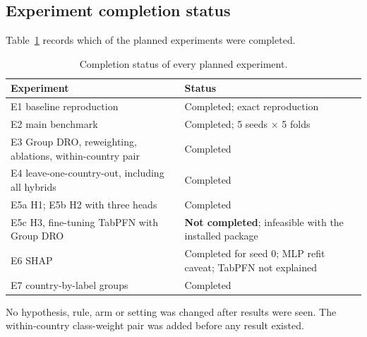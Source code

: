 \documentclass[11pt]{article}
\begin{document}
\subsection{Experiment completion status}

Table~\ref{tab:status} records which of the planned experiments were completed.

\begin{table}[H]
  \centering
  \small
  \caption{Completion status of every planned experiment.}
  \label{tab:status}
  \begin{tabular}{p{}p{}}
    \toprule
    Experiment & Status \\
    \midrule
    E1 baseline reproduction & Completed; exact reproduction \\
    E2 main benchmark & Completed; 5 seeds $\times$ 5 folds \\
    E3 Group DRO, reweighting, ablations, within-country pair & Completed \\
    E4 leave-one-country-out, including all hybrids & Completed \\
    E5a H1; E5b H2 with three heads & Completed \\
    E5c H3, fine-tuning TabPFN with Group DRO & \textbf{Not completed}; infeasible with the installed package \\
    E6 SHAP & Completed for seed 0; MLP refit caveat; TabPFN not explained \\
    E7 country-by-label groups & Completed \\
    \bottomrule
  \end{tabular}
\end{table}

No hypothesis, rule, arm or setting was changed after results were seen. The within-country class-weight pair was added before any result existed.

\end{document}
